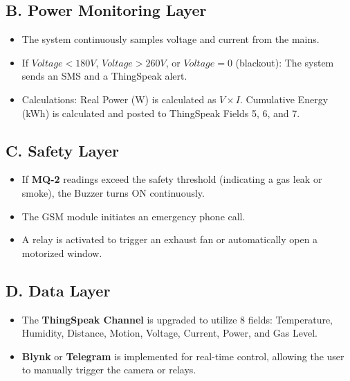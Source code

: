 \documentclass[12pt,a4paper]{article}
\begin{document}
\subsection{B. Power Monitoring Layer}
\begin{itemize}
    \item The system continuously samples voltage and current from the mains.
    \item If $Voltage < 180V$, $Voltage > 260V$, or $Voltage = 0$ (blackout): The system sends an SMS and a ThingSpeak alert.
    \item Calculations: Real Power (W) is calculated as $V \times I$. Cumulative Energy (kWh) is calculated and posted to ThingSpeak Fields 5, 6, and 7.
\end{itemize}

\subsection{C. Safety Layer}
\begin{itemize}
    \item If \textbf{MQ-2} readings exceed the safety threshold (indicating a gas leak or smoke), the Buzzer turns ON continuously.
    \item The GSM module initiates an emergency phone call.
    \item A relay is activated to trigger an exhaust fan or automatically open a motorized window.
\end{itemize}

\subsection{D. Data Layer}
\begin{itemize}
    \item The \textbf{ThingSpeak Channel} is upgraded to utilize 8 fields: Temperature, Humidity, Distance, Motion, Voltage, Current, Power, and Gas Level.
    \item \textbf{Blynk} or \textbf{Telegram} is implemented for real-time control, allowing the user to manually trigger the camera or relays.
\end{itemize}
\end{document}
